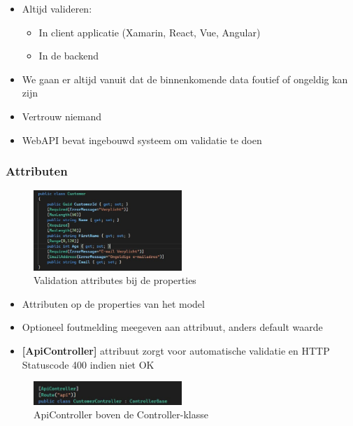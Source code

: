 \documentclass{article}
\begin{document}
\begin{itemize}
    \item Altijd valideren:
    \begin{itemize}
        \item In client applicatie (Xamarin, React, Vue, Angular)
        \item In de backend
    \end{itemize}
    \item We gaan er altijd vanuit dat de binnenkomende data foutief of ongeldig kan zijn
    \item Vertrouw niemand
    \item WebAPI bevat ingebouwd systeem om validatie te doen
\end{itemize}

\subsubsection{Attributen}

\begin{figure}[H]
    \centering
    \includegraphics[width=0.5\textwidth]{validation-attributes.png}
    \caption{Validation attributes bij de properties}
\end{figure}


\begin{itemize}
    \item Attributen op de properties van het model
    \item Optioneel foutmelding meegeven aan attribuut, anders default waarde
    \item \textbf{[ApiController]} attribuut zorgt voor automatische validatie en HTTP Statuscode 400 indien niet OK
\end{itemize}

\begin{figure}[H]
    \centering
    \includegraphics[width=0.5\textwidth]{validation-attributes2.png}
    \caption{ApiController boven de Controller-klasse}
\end{figure}
\end{document}
